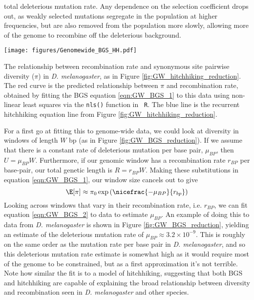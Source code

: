 total deleterious mutation rate. Any dependence on the selection
coefficient drops out, as weakly selected mutations segregate in the population at higher
frequencies, but are also removed from the population more slowly, allowing
more of the genome to recombine off the deleterious background. \\
\begin{marginfigure}[2cm]
\begin{center}
\texttt{[image: figures/Genomewide\_BGS\_HH.pdf]}
\end{center}
\caption{The relationship between recombination rate and synonymous
  site pairwise diversity ($\pi$) in {\it D. melanogaster}, as
  in Figure \ref{fig:GW_hitchhiking_reduction}. The red curve is the
  predicted relationship between $\pi$ and recombination rate, obtained
  by fitting the BGS equation \eqref{eqn:GW_BGS_1} to this data  
 using non-linear least squares via the {\tt nls()} function in {\tt
   R}. The blue line is the recurrent hitchhiking equation line from Figure
 \ref{fig:GW_hitchhiking_reduction}. } \label{fig:GW_BGS_reduction}
\end{marginfigure}

For a first go at fitting this to genome-wide data, we could look at
diversity in windows of length $W$ bp (as in Figure \ref{fig:GW_BGS_reduction}). If we assume that there is a constant rate of
deleterious mutation per base pair, $\mu_{BP}$, then $U=\mu_{BP}W$. Furthermore, if our genomic window has a
recombination rate $r_{BP}$ per base-pair, our total genetic length is
$R=r_{BP}W$. Making these substitutions in equation \eqref{eqn:GW_BGS_1}, our window size cancels out to give
\begin{equation}
  \E[\pi] \approx \pi_0 \exp \left(\nicefrac{-\mu_{BP}}{r_{bp}}
  \right) \label{eqn:GW_BGS_2}
 \end{equation}
Looking across windows that vary in their recombination rate,
i.e. $r_{BP}$, we can fit equation \eqref{eqn:GW_BGS_2} to data to
estimate $\mu_{BP}$. An example of doing this to data from {\it D. melanogaster}
  is shown in Figure
\ref{fig:GW_BGS_reduction}, yielding an estimate of the deleterious
mutation rate of $\mu_{BP}\approx
3.2 \times 10^{-9}$. This is roughly on the same order as the mutation
rate per base pair in  {\it D. melanogaster}, and so this deleterious mutation rate estimate is somewhat high as it
would require most of the genome to be constrained, but as a first
approximation it's not terrible. Note how similar the fit is to a model of
hitchhiking, suggesting that both BGS and hitchhiking are capable of explaining the
broad relationship between diversity and recombination seen in {\it D. melanogaster} and other species.

